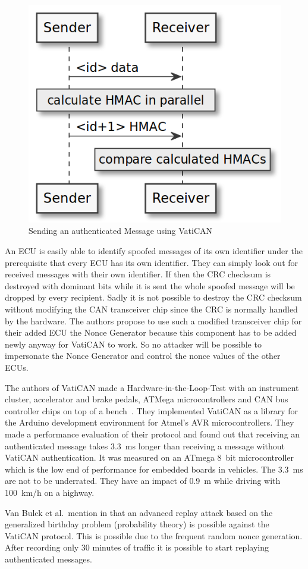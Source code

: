 \begin{figure}[h]
    \centering
    \captionsetup{justification=centering}
	\includegraphics[width=0.8\linewidth]{Figures/VatiCAN_sending_msg.png}
	\caption[]{Sending an authenticated Message using VatiCAN}
	\label{fig:vatican_sending_msg}
\end{figure}

An ECU is easily able to identify spoofed messages of its own identifier under
the prerequisite that every ECU has its own identifier. They can simply look out
for received messages with their own identifier. If then the CRC checksum is
destroyed with dominant bits while it is sent the whole spoofed message will be
dropped by every recipient. Sadly it is not possible to destroy the CRC checksum
without modifying the CAN transceiver chip since the CRC is normally handled by
the hardware. The authors propose to use such a modified transceiver chip for
their added ECU the Nonce Generator because this component has to be added newly
anyway for VatiCAN to work. So no attacker will be possible to impersonate the
Nonce Generator and control the nonce values of the other ECUs.

The authors of VatiCAN made a Hardware-in-the-Loop-Test with an instrument
cluster, accelerator and brake pedals, ATMega microcontrollers and CAN bus
controller chips on top of a bench~\cite{Nurnberger2016}. They implemented
VatiCAN as a library for the Arduino development environment for Atmel's AVR
microcontrollers. They made a performance evaluation of their protocol and found
out that receiving an authenticated message takes 3.3~ms longer than receiving a
message without VatiCAN authentication. It was measured on an ATmega 8~bit
microcontroller which is the low end of performance for embedded boards in
vehicles. The 3.3~ms are not to be underrated. They have an impact of 0.9~m
while driving with 100~km/h on a highway.

Van Bulck et al.\ mention in \cite{VanBulck2017} that an
advanced replay attack based on the generalized birthday problem (probability
theory) is possible against the VatiCAN protocol. This is possible due to the
frequent random nonce generation. After recording only 30 minutes of traffic it
is possible to start replaying authenticated messages.